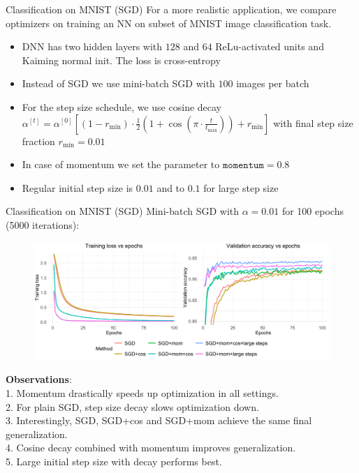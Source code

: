 \documentclass[11pt,compress,t,notes=noshow, xcolor=table]{beamer}
\begin{document}
\begin{vbframe}{Classification on MNIST (SGD)}
For a more realistic application, we compare optimizers on training an NN on subset of MNIST image classification task. 
\medskip
\begin{itemize}
     \setlength{\itemsep}{1.2em} 
    \item DNN has two hidden layers with $128$ and $64$ ReLu-activated units and Kaiming normal init. The loss is cross-entropy
    \item Instead of SGD we use mini-batch SGD with $100$ images per batch
    \item For the step size schedule, we use cosine decay $\alpha^{[t]} = \alpha^{[0]} \left[(1-r_{\text{min}}) \cdot \frac{1}{2}\left(1 + \cos\left(\pi \cdot \frac{t}{t_{\text{max}}}\right)\right) + r_{\text{min}}\right]$ with final step size fraction $r_{\text{min}}=0.01$
    \item In case of momentum we set the parameter to $\texttt{momentum}=0.8$
    \item Regular initial step size is $0.01$ and to $0.1$ for large step size
\end{itemize}
\end{vbframe}

\begin{vbframe}{Classification on MNIST (SGD)}
\vspace{-0.3cm}
Mini-batch SGD with $\alpha=0.01$ for 100 epochs (5000 iterations):
\begin{figure}
            \includegraphics[width=1.0\textwidth]{slides/04-multivariate-first-order/figure_man/simu_mnist/SGD_compar.pdf} \\
\end{figure}
{\footnotesize
\textbf{Observations}:\\ 1. Momentum drastically speeds up optimization in all settings.\\
2. For plain SGD, step size decay slows optimization down. \\
3. Interestingly, SGD, SGD+cos and SGD+mom achieve the same final generalization. \\
4. Cosine decay combined with momentum improves generalization. \\
5. Large initial step size with decay performs best.}
\end{vbframe}
\end{document}
